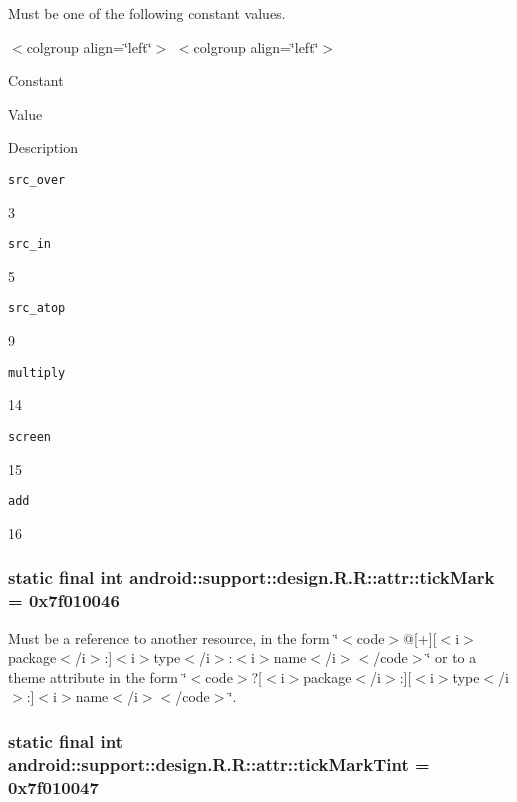 Must be one of the following constant values. \begin{TabularC}{0}
\hline
\end{TabularC}
$<$colgroup align=\char`\"{}left\char`\"{}$>$ $<$colgroup align=\char`\"{}left\char`\"{}$>$ 

Constant

Value

Description 

{\tt src\_\-over}

3

{\tt src\_\-in}

5

{\tt src\_\-atop}

9

{\tt multiply}

14

{\tt screen}

15

{\tt add}

16\hypertarget{classandroid_1_1support_1_1design_1_1_r_1_1attr_6c50b1d5e55dca45132be5d04834f82b}{
\subsubsection[{tickMark}]{\setlength{\rightskip}{0pt plus 5cm}static final int android::support::design.R.R::attr::tickMark = 0x7f010046}}
\label{classandroid_1_1support_1_1design_1_1_r_1_1attr_6c50b1d5e55dca45132be5d04834f82b}


Must be a reference to another resource, in the form \char`\"{}$<$code$>$@\mbox{[}+\mbox{]}\mbox{[}$<$i$>$package$<$/i$>$:\mbox{]}$<$i$>$type$<$/i$>$:$<$i$>$name$<$/i$>$$<$/code$>$\char`\"{} or to a theme attribute in the form \char`\"{}$<$code$>$?\mbox{[}$<$i$>$package$<$/i$>$:\mbox{]}\mbox{[}$<$i$>$type$<$/i$>$:\mbox{]}$<$i$>$name$<$/i$>$$<$/code$>$\char`\"{}. \hypertarget{classandroid_1_1support_1_1design_1_1_r_1_1attr_3957f77cbde9a6ae70c23f6c0ea1bc5b}{
\subsubsection[{tickMarkTint}]{\setlength{\rightskip}{0pt plus 5cm}static final int android::support::design.R.R::attr::tickMarkTint = 0x7f010047}}
\label{classandroid_1_1support_1_1design_1_1_r_1_1attr_3957f77cbde9a6ae70c23f6c0ea1bc5b}



